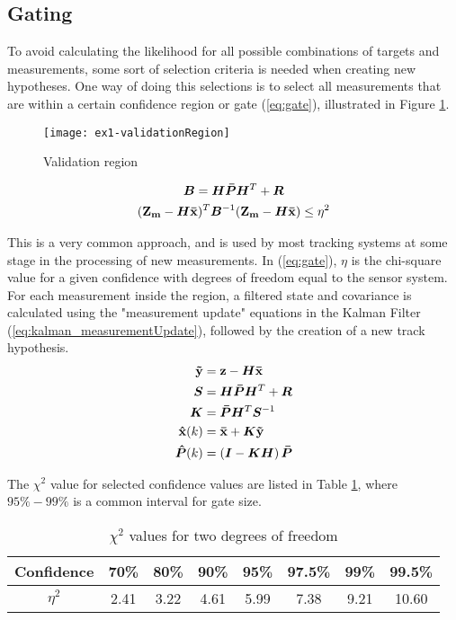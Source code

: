 \subsection{Gating}
To avoid calculating the likelihood for all possible combinations of targets and measurements, some sort of selection criteria is needed when creating new hypotheses. One way of doing this selections is to select all measurements that are within a certain confidence region or gate (\ref{eq:gate}), illustrated in Figure \ref{fig:validation_region}.
\begin{figure}[H]
\centering
\texttt{[image: ex1-validationRegion]}
\caption{Validation region}
\label{fig:validation_region}
\end{figure}
\begin{equation}
\begin{gathered}
\bm{B}	= \bm{H} \bm{\bar{P}} \bm{H}^T + \bm{R} \\
(\boldsymbol{\mathbf{Z_m}} - \bm{H}\boldsymbol{\mathbf{\bar{x}}})^T	\bm{B}^{-1} (\boldsymbol{\mathbf{Z_m}} - \bm{H}\boldsymbol{\mathbf{\bar{x}}}) \leq \eta^2
\label{eq:gate}
\end{gathered}
\end{equation}

This is a very common approach, and is used by most tracking systems at some stage in the processing of new measurements. In (\ref{eq:gate}), $\eta$ is the chi-square value for a given confidence with degrees of freedom equal to the sensor system. For each measurement inside the region, a filtered state and covariance is calculated using the "measurement update" equations in the Kalman Filter (\ref{eq:kalman_measurementUpdate}), followed by the creation of a new track hypothesis.
\begin{equation}
\begin{split}
\boldsymbol{\mathbf{\tilde{y}}}	&= \boldsymbol{\mathbf{z}} - \bm{H} \boldsymbol{\mathbf{\bar{x}}} \\
\bm{S}			&= \bm{H} \bm{\bar{P}} \bm{H}^T + \bm{R} \\
\bm{K} 			&= \bm{\bar{P}} \bm{H}^T \bm{S}^{-1} \\
\boldsymbol{\mathbf{\hat{x}}}(k) 	&= \boldsymbol{\mathbf{\bar{x}}} + \bm{K} \boldsymbol{\mathbf{\tilde{y}}} \\
\bm{\hat{P}}(k) 	&= \left( \bm{I} - \bm{K} \bm{H} \right) \bm{\bar{P}}
\end{split}
\label{eq:kalman_measurementUpdate}
\end{equation}

The $\chi^2$ value for selected confidence values are listed in Table \ref{tab:chi_square}, where $95\% - 99\%$ is a common interval for gate size. 
\begin{table}[H]
\centering
\begin{tabular}{c c c c c c c c}
Confidence 	& 70\% 	& 80\% 	& 90\% 	& 95\% 	& 97.5\% 	& 99\% 	& 99.5\% \\ \hline
$\eta^2$ 	& 2.41 	& 3.22 	& 4.61 	& 5.99 	& 7.38 		& 9.21 	& 10.60
\end{tabular}
\caption{$\chi^2$ values for two degrees of freedom}
\label{tab:chi_square}
\end{table}

